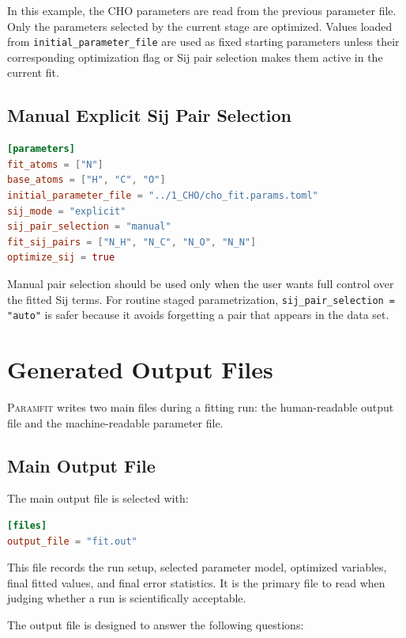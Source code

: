 \documentclass[11pt]{article}
\begin{document}
In this example, the CHO parameters are read from the previous parameter file.
Only the parameters selected by the current stage are optimized. Values loaded
from \texttt{initial\_parameter\_file} are used as fixed starting parameters
unless their corresponding optimization flag or Sij pair selection makes them
active in the current fit.

\subsection{Manual Explicit Sij Pair Selection}

\begin{lstlisting}[language=toml]
[parameters]
fit_atoms = ["N"]
base_atoms = ["H", "C", "O"]
initial_parameter_file = "../1_CHO/cho_fit.params.toml"
sij_mode = "explicit"
sij_pair_selection = "manual"
fit_sij_pairs = ["N_H", "N_C", "N_O", "N_N"]
optimize_sij = true
\end{lstlisting}

Manual pair selection should be used only when the user wants full control over
the fitted Sij terms. For routine staged parametrization,
\texttt{sij\_pair\_selection = "auto"} is safer because it avoids forgetting a
pair that appears in the data set.

\section{Generated Output Files}

\textsc{Paramfit} writes two main files during a fitting run: the human-readable
output file and the machine-readable parameter file.

\subsection{Main Output File}

The main output file is selected with:

\begin{lstlisting}[language=toml]
[files]
output_file = "fit.out"
\end{lstlisting}

This file records the run setup, selected parameter model, optimized variables,
final fitted values, and final error statistics. It is the primary file to read
when judging whether a run is scientifically acceptable.

The output file is designed to answer the following questions:
\end{document}
